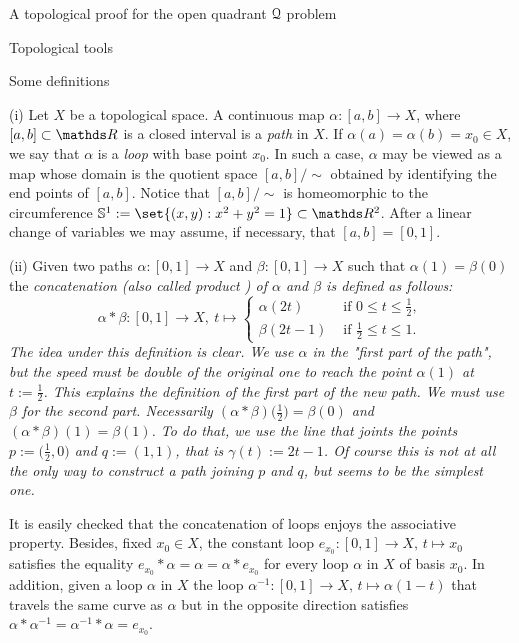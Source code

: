 \documentclass[11pt, a4paper, english, twoside, notitlepage, openright]{report}
\begin{document}
\begin{chapter}{A topological proof for the open quadrant $\mathcal{Q}$ problem}
\begin{section}{Topological tools}
\begin{subsection}{Some definitions}
\vspace{1mm}

\begin{definitions}\label{pathDefs}
(i) Let $X$ be a topological space. A continuous map $\alpha:[a,b]\to X$, where $[a,b]\subset\R$ is a closed interval is a \emph{path} in $X$. If $\alpha(a)=\alpha(b)=x_0\in X$, we say that $\alpha$ is a \emph{loop} with base point $x_0$. In such a case, $\alpha$ may be viewed as a map whose domain is the quotient space $[a,b]/\!\sim$ obtained by identifying the end points of $[a,b]$. Notice that $[a,b]/\!\sim$ is homeomorphic to the circumference $\mathbb{S}^1:=\set{(x,y):x^2+y^2=1}\subset\R^2$. After a linear change of variables we may assume, if necessary, that $[a,b]=[0,1]$.

\vspace{1mm}

(ii) Given two paths $\alpha:[0,1]\to X$ and $\beta:[0,1]\to X$ such that  $\alpha(1)=\beta(0)$ the \em concatenation \em (also called \em product \em) of $\alpha$ and $\beta$ is defined as follows:
$$
\alpha*\beta:[0,1]\longrightarrow X,\ t\longmapsto
\left\{\begin{array}{ll}
\alpha(2t) &\text{ if } 0\leq t\leq\tfrac{1}{2},\\
\beta(2t-1) &\text{ if } \tfrac{1}{2}\leq t\leq1.
\end{array}
\right.
$$
The idea under this definition is clear. We use $\alpha$ in the "first part of the path", but the speed must be double of the original one to reach the point $\alpha(1)$ at $t:=\tfrac{1}{2}$. This explains the definition of the first part of the new path. We must use $\beta$ for the second part. Necessarily $(\alpha*\beta)\big(\tfrac{1}{2}\big)=\beta(0)$ and $(\alpha*\beta)(1)=\beta(1)$. To do that, we use the line that joints the points $p:=\big(\tfrac{1}{2},0\big)$ and $q:=(1,1)$, that is $\gamma(t):=2t-1$. Of course this is not at all the only way to construct a path joining $p$ and $q$, but seems to be the simplest one.

It is easily checked that the concatenation of loops enjoys the associative property. Besides, fixed $x_0\in X$, the constant loop $e_{x_0}:[0,1]\to X,\, t\mapsto x_0$ satisfies the equality $e_{x_0}*\alpha=\alpha=\alpha*e_{x_0}$ for every loop $\alpha$ in $X$ of basis $x_0$. In addition, given a loop $\alpha$ in $X$ the loop $\alpha^{-1}:[0,1]\to X, \, t\mapsto\alpha(1-t)$ that travels the same curve as $\alpha$ but in the opposite direction satisfies $\alpha*\alpha^{-1}=\alpha^{-1}*\alpha=e_{x_0}$.


\end{definitions}
\end{subsection}
\end{section}
\end{chapter}
\end{document}
